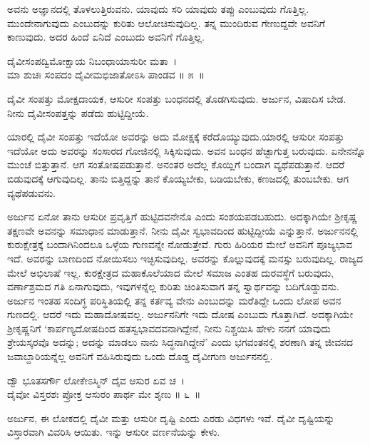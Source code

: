 ಅವನು ಅಜ್ಞಾನದಲ್ಲಿ ತೊಳಲುತ್ತಿರುವನು. ಯಾವುದು ಸರಿ ಯಾವುದು ತಪ್ಪು ಎಂಬುವುದು ಗೊತ್ತಿಲ್ಲ. ಮುಂದೇನಾಗುವುದು ಎಂಬುದನ್ನು ಕುರಿತು ಆಲೋಚಿಸುವುದಿಲ್ಲ. ತನ್ನ ಮುಂದಿರುವ ಗೇಣುದ್ದವೇ ಅವನಿಗೆ ಕಾಣುವುದು. ಅದರ ಹಿಂದೆ ಏನಿದೆ ಎಂಬುದು ಅವನಿಗೆ ಗೊತ್ತಿಲ್ಲ.

\begin{shloka}
ದೈವೀಸಂಪದ್ವಿಮೋಕ್ಷಾಯ ನಿಬಂಧಾಯಾಸುರೀ ಮತಾ~।\\ಮಾ ಶುಚಃ ಸಂಪದಂ ದೈವೀಮಭಿಜಾತೋಽಸಿ ಪಾಂಡವ \hfill॥ ೫~॥
\end{shloka}

\newpage

\begin{artha}
ದೈವೀ ಸಂಪತ್ತು ಮೋಕ್ಷದಾಯಕ, ಆಸುರೀ ಸಂಪತ್ತು ಬಂಧನದಲ್ಲಿ ತೊಡಗಿಸುವುದು. ಅರ್ಜುನ, ವಿಷಾದಿಸ ಬೇಡ. ನೀನು ದೈವೀಸಂಪತ್ತನ್ನು ಪಡೆದು ಹುಟ್ಟಿದ್ದೀಯೆ.
\end{artha}

ಯಾರಲ್ಲಿ ದೈವೀ ಸಂಪತ್ತು ಇದೆಯೋ ಅವರನ್ನು ಅದು ಮೋಕ್ಷಕ್ಕೆ ಕರೆದೊಯ್ಯುವುದು.\break ಯಾರಲ್ಲಿ ಆಸುರೀ ಸಂಪತ್ತು ಇದೆಯೋ ಅದು ಅವರನ್ನು ಸಂಸಾರದ ಗೋಜಿನಲ್ಲಿ ಸಿಕ್ಕಿಸುವುದು. ಅವನ ಬಂಧನ ಹೆಚ್ಟಾಗುತ್ತ ಬರುವುದು. ಏನೇನನ್ನೊ ಮುಂಚೆ ಬಿತ್ತುತ್ತಾನೆ. ಆಗ ಸಂತೋಷಪಡುತ್ತಾನೆ. ಅನಂತರ ಅದೆಲ್ಲ ಕೊಯ್ಲಿಗೆ ಬಂದಾಗ ವ್ಯಥೆಪಡುತ್ತಾನೆ. ಆದರೆ ಬಿಡುವುದಕ್ಕೆ ಆಗುವುದಿಲ್ಲ. ತಾನು ಬಿತ್ತಿದ್ದನ್ನು ತಾನೆ ಕೊಯ್ಯಬೇಕು, ಬಡಿಯಬೇಕು, ಕಣಜದಲ್ಲಿ ತುಂಬಬೇಕು. ಆಗ ವ್ಯಥೆಪಡುವನು.

ಅರ್ಜುನ ಏನೋ ತಾನು ಆಸುರೀ ಪ್ರವೃತ್ತಿಗೆ ಹುಟ್ಟಿದವನೇನೊ ಎಂದು ಸಂಶಯಪಡಬಹುದು. ಅದಕ್ಕಾಗಿಯೇ ಶ‍್ರೀಕೃಷ್ಣ ತಕ್ಷಣವೇ ಅವನನ್ನು ಸಮಾಧಾನ ಮಾಡುತ್ತಾನೆ. ನೀನು ದೈವೀ ಸ್ವಭಾವದಿಂದ ಹುಟ್ಟಿದ್ದೀಯೆ ಎನ್ನುತ್ತಾನೆ. ಅರ್ಜುನನಲ್ಲಿ ಕುರುಕ್ಷೇತ್ರಕ್ಕೆ ಬಂದಾಗಿನಿಂದಲೂ ಒಳ್ಳೆಯ ಗುಣವನ್ನೇ ನೋಡುತ್ತೇವೆ. ಗುರು ಹಿರಿಯರ ಮೇಲೆ ಅವನಿಗೆ ಪೂಜ್ಯಭಾವ ಇದೆ. ಅವರನ್ನು ಬಾಣದಿಂದ ನೋಯಿಸಲು ಇಚ್ಛಿಸುವುದಿಲ್ಲ. ಅವರನ್ನು ಕೊಲ್ಲುವುದಕ್ಕೆ ಮನಸ್ಸು ಬರುವುದಿಲ್ಲ. ರಾಜ್ಯದ ಮೇಲೆ ಅಭಿಲಾಷೆ ಇಲ್ಲ. ಕುರಕ್ಷೇತ್ರದ ಮಹಾಕೊಲೆಯಾದ ಮೇಲೆ ಸಮಾಜ ಎಂತಹ ದುರವಸ್ಥೆಗೆ ಬರುವುದು, ವರ್ಣಾಶ್ರಮದ ಗತಿ ಏನಾಗುವುದು, ಇವುಗಳನ್ನೆಲ್ಲ ಕುರಿತು ಚಿಂತಿಸುವಾಗ ತನ್ನ ಸ್ವಾರ್ಥವನ್ನು ಬದಿಗೊಡ್ಡುವನು. ಅರ್ಜುನ ಇಂತಹ ಸಂದಿಗ್ಧ ಪರಿಸ್ಥಿತಿಯಲ್ಲಿ ತನ್ನ ಕರ್ತವ್ಯ ವೇನು ಎಂಬುದನ್ನು ಮರೆತಿದ್ದೇ ಒಂದು ಲೋಪ ಅವನ ಗುಣದಲ್ಲಿ. ಆದರೆ ಇದು ಮಹಾದೋಷವಲ್ಲ. ಅರ್ಜುನನಿಗೇ ಇದು ದೋಷ ಎಂಬುದು ಗೊತ್ತಾಗಿದೆ. ಅದಕ್ಕಾಗಿಯೇ ಶ‍್ರೀಕೃಷ್ಣನಿಗೆ ‘ಕಾರ್ಪಣ್ಯದೋಷದಿಂದ ಹತಸ್ವಭಾವದವನಾಗಿದ್ದೇನೆ, ನೀನು ನಿಶ್ಚಯಿಸಿ ಹೇಳು ನನಗೆ ಯಾವುದು ಶ್ರೇಯಸ್ಕರವೊ ಅದನ್ನು; ಅದನ್ನು ಮಾಡಲು ನಾನು ಸಿದ್ಧನಾಗಿದ್ದೇನೆ’ ಎಂದು ಭಗವಂತನಲ್ಲಿ ಶರಣಾಗಿ ತನ್ನ ಜೀವನದ ಜವಾಬ್ದಾರಿಯನ್ನೆಲ್ಲ ಅವನಿಗೆ ವಹಿಸಿರುವುದು ಒಂದು ದೊಡ್ಡ ದೈವೀಗುಣ ಅರ್ಜುನನಲ್ಲಿ.

\begin{shloka}
ದ್ವೌ ಭೂತಸರ್ಗೌ ಲೋಕೇಽಸ್ಮಿನ್ ದೈವ ಆಸುರ ಏವ ಚ~।\\ದೈವೋ ವಿಸ್ತರಶಃ ಪ್ರೋಕ್ತ ಆಸುರಂ ಪಾರ್ಥ ಮೇ ಶೃಣು \hfill॥ ೬~॥
\end{shloka}

\begin{artha}
ಅರ್ಜುನ, ಈ ಲೋಕದಲ್ಲಿ ದೈವೀ ಮತ್ತು ಆಸುರೀ ದೃಷ್ಟಿ ಎಂದು ಎರಡು ವಿಧಗಳು ಇವೆ. ದೈವೀ ದೃಷ್ಟಿಯನ್ನು ವಿಸ್ತಾರವಾಗಿ ವಿವರಿಸಿ ಆಯಿತು. ಇನ್ನು ಆಸುರೀ ವರ್ಣನೆಯನ್ನು ಕೇಳು.
\end{artha}

